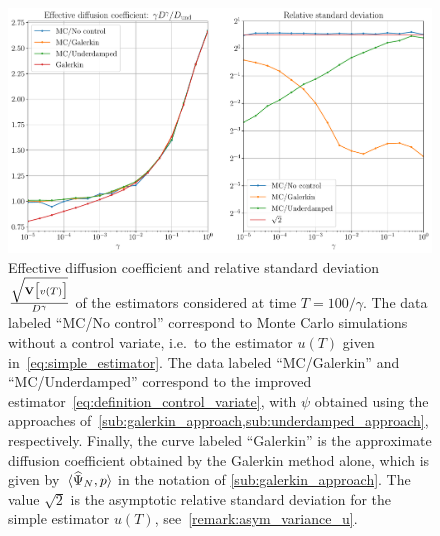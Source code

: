 \documentclass[11pt,a4paper]{article}
\begin{document}
\begin{figure}[ht]
    \centering
    \includegraphics[width=0.99\linewidth]{figures/underdamped_1d.pdf}
    \caption{
        Effective diffusion coefficient and relative standard deviation $\frac{\sqrt{\mathbf{V}\bigl[v(T)\bigr]}} {D^{\gamma}}$ of the estimators considered at time $T = 100/\gamma$.
        The data labeled ``MC/No control'' correspond to Monte Carlo simulations without a control variate,
        i.e.\ to the estimator $u(T)$ given in~\eqref{eq:simple_estimator}.
        The data labeled ``MC/Galerkin'' and ``MC/Underdamped'' correspond to the improved estimator~\eqref{eq:definition_control_variate},
        with $\psi$ obtained using the approaches of~\cref{sub:galerkin_approach,sub:underdamped_approach},
        respectively.
        Finally, the curve labeled ``Galerkin'' is the approximate diffusion coefficient obtained by the Galerkin method alone,
        which is given by~$\ip*{\widehat \Psi_N}{p}$ in the notation of \cref{sub:galerkin_approach}.
        The value $\sqrt{2}$ is the asymptotic relative standard deviation for the simple estimator $u(T)$,
        see~\cref{remark:asym_variance_u}.
    }%
    \label{fig:effective_diffusion_langevin}
\end{figure}
\end{document}

